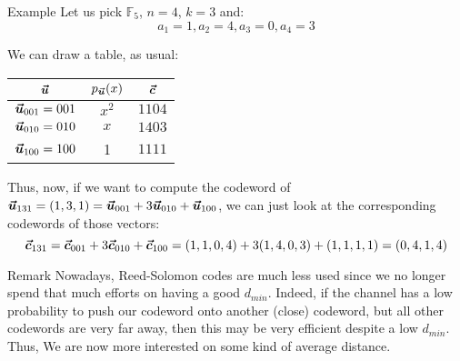 \documentclass[a4paper]{article}
\begin{document}
\begin{parag}{Example}
    Let us pick $\mathbb{F}_5$, $n = 4$, $k = 3$ and: 
    \[a_1 = 1, a_2 = 4, a_3 = 0, a_4 = 3\]
    
    We can draw a table, as usual:
    \begin{center}
    \begin{tabular}{c|c|c}
        $\bm{\protect\vec{u}}$ & $p_{\bvec{u}}\left(x\right)$ & $\bm{\protect\vec{c}}$ \\
        \hline
        $\bm{\protect\vec{u}}_{001} = 001$ & $x^2$ & $1104$ \\
        $\bm{\protect\vec{u}}_{010} = 010$ & $x$ & $1403$ \\
        $\bm{\protect\vec{u}}_{100} = 100$ & 1 & $1111$
    \end{tabular}
    \end{center}
    
    Thus, now, if we want to compute the codeword of $\bvec{u}_{131} = \left(1, 3, 1\right) = \bvec{u}_{001} + 3 \bvec{u}_{010} + \bvec{u}_{100}$, we can just look at the corresponding codewords of those vectors: 
    \[\bvec{c}_{131} = \bvec{c}_{001} + 3 \bvec{c}_{010} + \bvec{c}_{100} = \left(1, 1, 0, 4\right) + 3\left(1, 4, 0, 3\right) + \left(1, 1, 1, 1\right) = \left(0, 4, 1, 4\right)\]
    
\end{parag}

\begin{parag}{Remark}
    Nowadays, Reed-Solomon codes are much less used since we no longer spend that much efforts on having a good $d_{min}$. Indeed, if the channel has a low probability to push our codeword onto another (close) codeword, but all other codewords are very far away, then this may be very efficient despite a low $d_{min}$. Thus, We are now more interested on some kind of average distance.
\end{parag}
\end{document}
